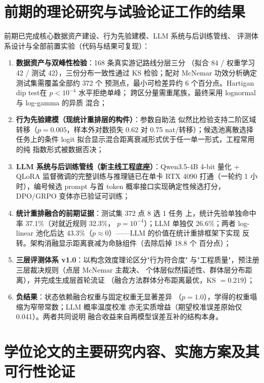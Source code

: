 \section{前期的理论研究与试验论证工作的结果}

前期已完成核心数据资产建设、行为先验建模、LLM 系统与后训练管线、
评测体系设计与全部前置实验（代码与结果可复现）：
\begin{enumerate}
  \item \textbf{数据资产与双峰性检验}：168 条真实游记路线分层三分
        （拟合 84 / 权重学习 42 / 测试 42），三份分布一致性通过 KS
        检验；配对 McNemar 功效分析确定测试集需覆盖全部约 372 个
        预测点，最小可检差异约 6 个百分点。Hartigan dip
        test\cite{hartigan1985dip}在 $p<10^{-4}$ 水平拒绝单峰；
        跨区分量需重尾族，最终采用 lognormal 与 log-gamma 的异质
        混合；
  \item \textbf{行为先验建模（现统计重排层的构件）}：参数自助法
        似然比检验支持二阶区域转移（$p=0.005$，样本外对数损失
        0.62 对 0.75 nat/转移）；候选池离散选择任务上的条件 logit
        拟合显示混合距离衰减形式优于任一单一形式，工程常用的纯
        指数形式被数据否决；
  \item \textbf{LLM 系统与后训练管线（新主线工程底座）}：Qwen3.5-4B
        4-bit 量化 + QLoRA 监督微调的完整训练与推理链已在单卡
        RTX 4090 打通（一轮约 1 小时），编号候选 prompt 与首 token
        概率接口实现确定性候选打分，DPO/GRPO 变体亦已验证可训练；
  \item \textbf{统计重排融合的前期证据}：测试集 372 点 8 选 1 任务
        上，统计先验单独命中率 37.1\%（对就近规则 32.3\%，
        $p=10^{-4}$）；LLM 单独仅 26.6\%；两者 log-linear 池化后达
        43.3\%（$p\approx0$）——LLM 的价值在统计重排框架下实现
        反转。架构消融显示距离衰减为命脉组件（去除后掉 18.8 个
        百分点）；
  \item \textbf{三层评测体系 v1.0}：以构念效度理论区分"行为符合度"
        与"工程质量"，预注册三层裁决规则（点层 McNemar 主裁决、
        个体层似然描述性、群体层分布距离），并完成生成层首轮流证
        （融合方法群体分布距离最优，KS $=0.219$）；
  \item \textbf{负结果}：状态依赖融合权重与固定权重无显著差异
        （$p=1.0$），学得的权重塌缩为窄带常数；LLM 概率温度校准
        亦无实质增益（期望校准误差原始仅 0.041）。两者共同说明
        融合收益来自两模型误差互补的结构本身。
\end{enumerate}

\section{学位论文的主要研究内容、实施方案及其可行性论证}

